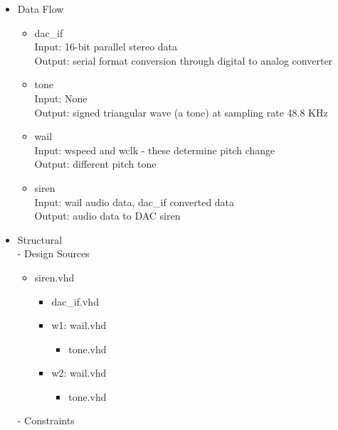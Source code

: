  \begin{itemize}
     \item Data Flow
     \begin{itemize}
         \item dac\_if\\
         Input: 16-bit parallel stereo data\\
         Output: serial format conversion through digital to analog converter\\
         \item tone\\
         Input: None\\
         Output: signed triangular wave (a tone)  at sampling rate 48.8 KHz
         \item wail\\
         Input: wspeed and wclk - these determine pitch change\\
         Output: different pitch tone\\
         \item siren\\
         Input: wail audio data, dac\_if converted data\\
         Output: audio data to DAC siren
     \end{itemize}
     \item Structural\\
     - Design Sources\\
         \begin{itemize}
             \item siren.vhd
             \begin{itemize}
                 \item dac\_if.vhd
                 \item w1: wail.vhd
                 \begin{itemize}
                     \item tone.vhd
                 \end{itemize}
                 \item w2: wail.vhd
                 \begin{itemize}
                     \item tone.vhd
                 \end{itemize}
             \end{itemize}
         \end{itemize}
         - Constraints\\
         \begin{itemize}

\end{itemize}
\end{itemize}
